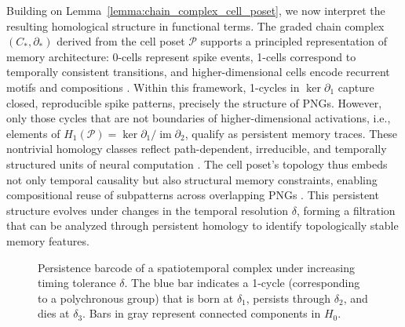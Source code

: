 \documentclass[lettersize,journal]{IEEEtran}
\begin{document}
Building on Lemma~\ref{lemma:chain_complex_cell_poset}, we now interpret the resulting homological structure in functional terms. The graded chain complex \( (C_*, \partial_*) \) derived from the cell poset \( \mathcal{P} \) supports a principled representation of memory architecture: 0-cells represent spike events, 1-cells correspond to temporally consistent transitions, and higher-dimensional cells encode recurrent motifs and compositions \cite{izhikevich2006polychronization}. Within this framework, 1-cycles in \( \ker \partial_1 \) capture closed, reproducible spike patterns, precisely the structure of PNGs. However, only those cycles that are not boundaries of higher-dimensional activations, i.e., elements of \( H_1(\mathcal{P}) = \ker \partial_1 / \operatorname{im} \partial_2 \), qualify as persistent memory traces. These nontrivial homology classes reflect path-dependent, irreducible, and temporally structured units of neural computation \cite{giusti2015clique}. The cell poset's topology thus embeds not only temporal causality but also structural memory constraints, enabling compositional reuse of subpatterns across overlapping PNGs \cite{sizemore2019importance}. This persistent structure evolves under changes in the temporal resolution \( \delta \), forming a filtration that can be analyzed through persistent homology \cite{edelsbrunner2008persistent} to identify topologically stable memory features.


\begin{figure}[h]
\centering
{}
\caption{Persistence barcode of a spatiotemporal complex under increasing timing tolerance \( \delta \). The blue bar indicates a 1-cycle (corresponding to a polychronous group) that is born at \( \delta_1 \), persists through \( \delta_2 \), and dies at \( \delta_3 \). Bars in gray represent connected components in \( H_0 \).}
\label{fig:persistent_barcode}
\end{figure}
\end{document}

